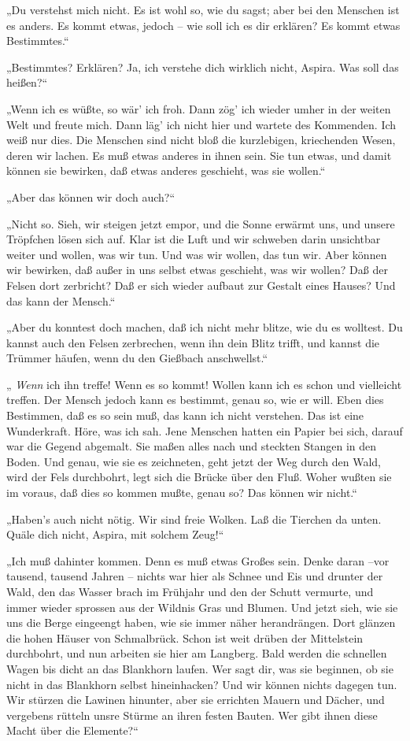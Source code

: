 „Du verstehst mich nicht. Es ist wohl so, wie du sagst; aber bei
den Menschen ist es anders. Es kommt etwas, jedoch – wie soll ich
es dir erklären? Es kommt etwas Bestimmtes.“

„Bestimmtes? Erklären? Ja, ich verstehe dich wirklich nicht,
Aspira. Was soll das heißen?“

„Wenn ich es wüßte, so wär' ich froh. Dann zög' ich wieder umher in
der weiten Welt und freute mich. Dann läg' ich nicht hier und
wartete des Kommenden. Ich weiß nur dies. Die Menschen sind nicht
bloß die kurzlebigen, kriechenden Wesen, deren wir lachen. Es muß
etwas anderes in ihnen sein. Sie tun etwas, und damit können sie
bewirken, daß etwas anderes geschieht, was sie wollen.“

„Aber das können wir doch auch?“

„Nicht so. Sieh, wir steigen jetzt empor, und die Sonne erwärmt
uns, und unsere Tröpfchen lösen sich auf. Klar ist die Luft und wir
schweben darin unsichtbar weiter und wollen, was wir tun. Und was
wir wollen, das tun wir. Aber können wir bewirken, daß außer in uns
selbst etwas geschieht, was wir wollen? Daß der Felsen dort
zerbricht? Daß er sich wieder aufbaut zur Gestalt eines Hauses? Und
das kann der Mensch.“

„Aber du konntest doch machen, daß ich nicht mehr blitze, wie du es
wolltest. Du kannst auch den Felsen zerbrechen, wenn ihn dein Blitz
trifft, und kannst die Trümmer häufen, wenn du den Gießbach
anschwellst.“

„ \emph{Wenn} ich ihn treffe! Wenn es so kommt! Wollen kann ich es
schon und vielleicht treffen. Der Mensch jedoch kann es bestimmt,
genau so, wie er will. Eben dies Bestimmen, daß es so sein muß, das
kann ich nicht verstehen. Das ist eine Wunderkraft. Höre, was ich
sah. Jene Menschen hatten ein Papier bei sich, darauf war die
Gegend abgemalt. Sie maßen alles nach und steckten Stangen in den
Boden. Und genau, wie sie es zeichneten, geht jetzt der Weg durch
den Wald, wird der Fels durchbohrt, legt sich die Brücke über den
Fluß. Woher wußten sie im voraus, daß dies so kommen mußte, genau
so? Das können wir nicht.“

„Haben's auch nicht nötig. Wir sind freie Wolken. Laß die Tierchen
da unten. Quäle dich nicht, Aspira, mit solchem Zeug!“

„Ich muß dahinter kommen. Denn es muß etwas Großes sein. Denke
daran –vor tausend, tausend Jahren – nichts war hier als Schnee und
Eis und drunter der Wald, den das Wasser brach im Frühjahr und den
der Schutt vermurte, und immer wieder sprossen aus der Wildnis Gras
und Blumen. Und jetzt sieh, wie sie uns die Berge eingeengt haben,
wie sie immer näher herandrängen. Dort glänzen die hohen Häuser von
Schmalbrück. Schon ist weit drüben der Mittelstein durchbohrt, und
nun arbeiten sie hier am Langberg. Bald werden die schnellen Wagen
bis dicht an das Blankhorn laufen. Wer sagt dir, was sie beginnen,
ob sie nicht in das Blankhorn selbst hineinhacken? Und wir können
nichts dagegen tun. Wir stürzen die Lawinen hinunter, aber sie
errichten Mauern und Dächer, und vergebens rütteln unsre Stürme an
ihren festen Bauten. Wer gibt ihnen diese Macht über die
Elemente?“

